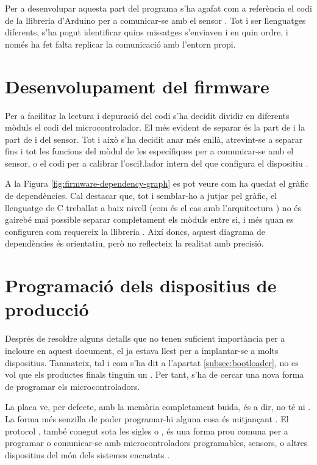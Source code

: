 Per a desenvolupar aquesta part del programa s'ha agafat com a referència el
codi de la llibreria d'Arduino per a comunicar-se amb el sensor
\cite{mpu6050ino}. Tot i ser llenguatges diferents, s'ha pogut identificar
quins missatges  s'enviaven i en quin ordre, i només ha fet falta
replicar la comunicació amb l'entorn propi.

\section{Desenvolupament del firmware}

Per a facilitar la lectura i depuració del codi s'ha decidit dividir en
diferents mòduls el codi del microcontrolador. El més evident de separar és
la part de  i la part de  i del sensor. Tot i això s'ha
decidit anar més enllà, atrevint-se a separar fins i tot les funcions del mòdul
 de les específiques per a comunicar-se amb el sensor, o el codi per
a calibrar l'osci\l.lador intern del que configura el dispositiu . 

A la Figura \ref{fig:firmware-dependency-graph} es pot veure com ha quedat el gràfic
de dependències. Cal destacar que, tot i semblar-ho a jutjar pel gràfic, el
llenguatge de C treballat a baix nivell (com és el cas amb l'arquitectura
) no és gairebé mai possible separar completament els mòduls entre
si, i més quan es configuren com requereix la llibreria . Així
doncs, aquest diagrama de dependències és orientatiu, però no reflecteix la
realitat amb precisió.



\section{Programació dels dispositius de producció}

Després de resoldre alguns detalls que no tenen suficient importància per a
incloure en aquest document, el  ja estava llest per a 
implantar-se a molts dispositius. Tanmateix, tal i com s'ha dit a
l'apartat \ref{subsec:bootloader}, no es vol que els productes finals tinguin
un . Per tant, s'ha de cercar una nova forma de programar
els microcontroladors.

La placa  ve, per defecte, amb la memòria  completament
buida, és a dir, no té ni . La forma més senzilla de poder
programar-hi alguna cosa és mitjançant . El protocol
, també conegut sota les sigles  o
, és una forma prou comuna per a
programar o comunicar-se amb microcontroladors programables, sensors, o altres
dispositius del món dels sistemes encastats \cite{Isp}.

